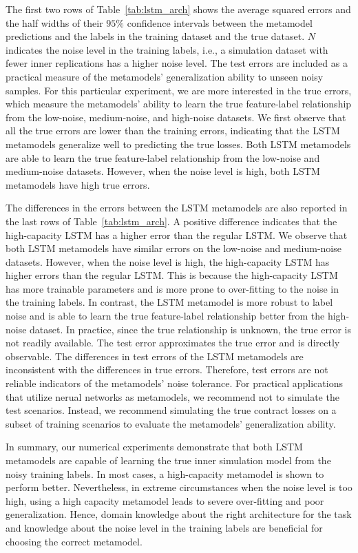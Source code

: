 The first two rows of Table~\ref{tab:lstm_arch} shows the average squared errors and the half widths of their $95\%$ confidence intervals between the metamodel predictions and the labels in the training dataset and the true dataset.
$N$ indicates the noise level in the training labels, i.e., a simulation dataset with fewer inner replications has a higher noise level.
The test errors are included as a practical measure of the metamodels' generalization ability to unseen noisy samples.
For this particular experiment, we are more interested in the true errors, which measure the metamodels' ability to learn the true feature-label relationship from the low-noise, medium-noise, and high-noise datasets.
We first observe that all the true errors are lower than the training errors, indicating that the LSTM metamodels generalize well to predicting the true losses.
Both LSTM metamodels are able to learn the true feature-label relationship from the low-noise and medium-noise datasets.
However, when the noise level is high, both LSTM metamodels have high true errors.

The differences in the errors between the LSTM metamodels are also reported in the last rows of Table~\ref{tab:lstm_arch}.
A positive difference indicates that the high-capacity LSTM has a higher error than the regular LSTM.
We observe that both LSTM metamodels have similar errors on the low-noise and medium-noise datasets.
However, when the noise level is high, the high-capacity LSTM has higher errors than the regular LSTM.
This is because the high-capacity LSTM has more trainable parameters and is more prone to over-fitting to the noise in the training labels.
In contrast, the LSTM metamodel is more robust to label noise and is able to learn the true feature-label relationship better from the high-noise dataset.
In practice, since the true relationship is unknown, the true error is not readily available.
The test error approximates the true error and is directly observable.
The differences in test errors of the LSTM metamodels are inconsistent with the differences in true errors.
Therefore, test errors are not reliable indicators of the metamodels' noise tolerance.
For practical applications that utilize nerual networks as metamodels, we recommend not to simulate the test scenarios.
Instead, we recommend simulating the true contract losses on a subset of training scenarios to evaluate the metamodels' generalization ability.

In summary, our numerical experiments demonstrate that both LSTM metamodels are capable of learning the true inner simulation model from the noisy training labels.
In most cases, a high-capacity metamodel is shown to perform better.
Nevertheless, in extreme circumstances when the noise level is too high, using a high capacity metamodel leads to severe over-fitting and poor generalization.
Hence, domain knowledge about the right architecture for the task and knowledge about the noise level in the training labels are beneficial for choosing the correct metamodel.

